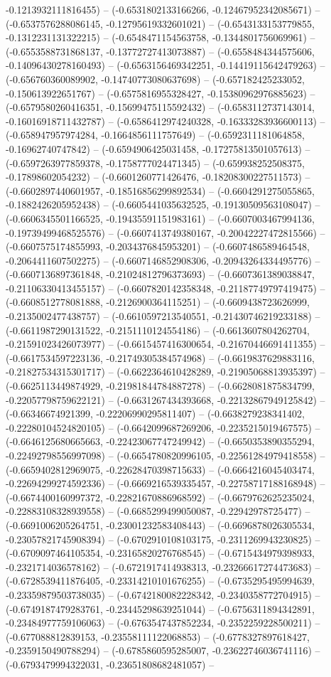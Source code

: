 -0.1213932111816455) -- (-0.6531802133166266, -0.12467952342085671) -- (-0.6537576288086145, -0.12795619332601021) -- (-0.6543133153779855, -0.1312231131322215) -- (-0.6548471154563758, -0.1344801756069961) -- (-0.6553588731868137, -0.13772727413073887) -- (-0.6558484344575606, -0.14096430278160493) -- (-0.6563156469342251, -0.14419115642479263) -- (-0.656760360089902, -0.14740773080637698) -- (-0.657182425233052, -0.150613922651767) -- (-0.6575816955328427, -0.15380962976885623) -- (-0.6579580260416351, -0.15699475115592432) -- (-0.6583112737143014, -0.16016918711432787) -- (-0.6586412974240328, -0.16333283936600113) -- (-0.658947957974284, -0.1664856111757649) -- (-0.6592311181064858, -0.16962740747842) -- (-0.6594906425031458, -0.17275813501057613) -- (-0.6597263977859378, -0.1758777024471345) -- (-0.659938252508375, -0.17898602054232) -- (-0.6601260771426476, -0.18208300227511573) -- (-0.6602897440601957, -0.18516856299892534) -- (-0.6604291275055865, -0.1882426205952438) -- (-0.6605441035632525, -0.19130509563108047) -- (-0.6606345501166525, -0.19435591151983161) -- (-0.6607003467994136, -0.19739499468525576) -- (-0.6607413749380167, -0.20042227472815566) -- (-0.6607575174855993, -0.2034376845953201) -- (-0.6607486589464548, -0.2064411607502275) -- (-0.6607146852908306, -0.20943264334495776) -- (-0.6607136897361848, -0.21024812796373693) -- (-0.6607361389038847, -0.21106330413455157) -- (-0.6607820142358348, -0.21187749797419475) -- (-0.6608512778081888, -0.2126900364115251) -- (-0.6609438723626999, -0.2135002477438757) -- (-0.6610597213540551, -0.21430746219233188) -- (-0.6611987290131522, -0.2151110124554186) -- (-0.6613607804262704, -0.21591023426073977) -- (-0.6615457416300654, -0.21670446691411355) -- (-0.6617534597223136, -0.21749305384574968) -- (-0.6619837629883116, -0.21827534315301717) -- (-0.6622364610428289, -0.21905068813935397) -- (-0.6625113449874929, -0.21981844784887278) -- (-0.6628081875834799, -0.22057798759622121) -- (-0.6631267434393668, -0.22132867949125842) -- (-0.66346674921399, -0.22206990295811407) -- (-0.6638279238341402, -0.22280104524820105) -- (-0.6642099687269206, -0.2235215019467575) -- (-0.6646125680665663, -0.22423067747249942) -- (-0.6650353890355294, -0.22492798556997098) -- (-0.6654780820996105, -0.22561284979418558) -- (-0.6659402812969075, -0.22628470398715633) -- (-0.6664216045403474, -0.22694299274592336) -- (-0.6669216539335457, -0.22758717188168948) -- (-0.6674400160997372, -0.22821670886968592) -- (-0.6679762625235024, -0.22883108328939558) -- (-0.6685299499050087, -0.22942978725477) -- (-0.6691006205264751, -0.23001232583408443) -- (-0.6696878026305534, -0.23057821745908394) -- (-0.6702910108103175, -0.2311269943230825) -- (-0.6709097464105354, -0.23165820276768545) -- (-0.6715434979398933, -0.2321714036578162) -- (-0.6721917414938313, -0.23266617274473683) -- (-0.6728539411876405, -0.23314210101676255) -- (-0.6735295495994639, -0.23359879503738035) -- (-0.6742180082228342, -0.2340358772704915) -- (-0.6749187479283761, -0.23445298639251044) -- (-0.6756311894342891, -0.23484977759106063) -- (-0.6763547437852234, -0.2352259228500211) -- (-0.677088812839153, -0.23558111122068853) -- (-0.6778327897618427, -0.2359150490788294) -- (-0.6785860595285007, -0.23622746036741116) -- (-0.6793479994322031, -0.23651808682481057) -- 